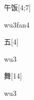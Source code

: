 \begin{verbete}[wu3fan4]{午饭}[4;7]
\begin{pronuncia}{wu3fan4}
\end{pronuncia}
\end{verbete}

\begin{verbete}[wu3]{五}[4]
\begin{pronuncia}{wu3}
\end{pronuncia}
\end{verbete}

\begin{verbete}[wu3]{舞}[14]
\begin{pronuncia}{wu3}
\end{pronuncia}
\end{verbete}

